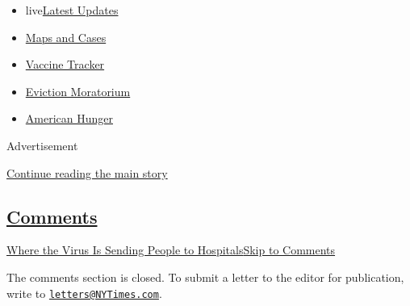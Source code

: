 \begin{itemize}
\tightlist
\item
  live\href{https://www.nytimes3xbfgragh.onion/2020/09/08/world/covid-19-coronavirus.html?name=styln-coronavirus-national\&region=TOP_BANNER\&block=storyline_menu_recirc\&action=click\&pgtype=Interactive\&impression_id=7a017311-f1c8-11ea-8758-972576ee5dee\&variant=undefined}{Latest
  Updates}
\item
  \href{https://www.nytimes3xbfgragh.onion/interactive/2020/us/coronavirus-us-cases.html?name=styln-coronavirus-national\&region=TOP_BANNER\&block=storyline_menu_recirc\&action=click\&pgtype=Interactive\&impression_id=7a017312-f1c8-11ea-8758-972576ee5dee\&variant=undefined}{Maps
  and Cases}
\item
  \href{https://www.nytimes3xbfgragh.onion/interactive/2020/science/coronavirus-vaccine-tracker.html?name=styln-coronavirus-national\&region=TOP_BANNER\&block=storyline_menu_recirc\&action=click\&pgtype=Interactive\&impression_id=7a017313-f1c8-11ea-8758-972576ee5dee\&variant=undefined}{Vaccine
  Tracker}
\item
  \href{https://www.nytimes3xbfgragh.onion/2020/09/02/your-money/eviction-moratorium-covid.html?name=styln-coronavirus-national\&region=TOP_BANNER\&block=storyline_menu_recirc\&action=click\&pgtype=Interactive\&impression_id=7a019a20-f1c8-11ea-8758-972576ee5dee\&variant=undefined}{Eviction
  Moratorium}
\item
  \href{https://www.nytimes3xbfgragh.onion/interactive/2020/09/02/magazine/food-insecurity-hunger-us.html?name=styln-coronavirus-national\&region=TOP_BANNER\&block=storyline_menu_recirc\&action=click\&pgtype=Interactive\&impression_id=7a019a21-f1c8-11ea-8758-972576ee5dee\&variant=undefined}{American
  Hunger}
\end{itemize}

Advertisement

\protect\hyperlink{after-top}{Continue reading the main story}

\hypertarget{comments}{%
\subsection{\texorpdfstring{\protect\hyperlink{commentsContainer}{Comments}}{Comments}}\label{comments}}

\href{}{Where the Virus Is Sending People to Hospitals}\href{}{Skip to
Comments}

The comments section is closed. To submit a letter to the editor for
publication, write to
\href{mailto:letters@NYTimes.com}{\nolinkurl{letters@NYTimes.com}}.

